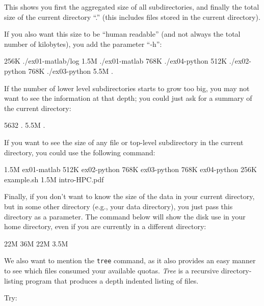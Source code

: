 This shows you first the aggregated size of all subdirectories, and finally the
total size of the current directory ``.'' (this includes files stored in the
current directory).

If you also want this size to be ``human readable'' (and not always the total
number of kilobytes), you add the parameter ``-h'':

\begin{prompt}
256K ./ex01-matlab/log
1.5M ./ex01-matlab
768K ./ex04-python
512K ./ex02-python
768K ./ex03-python
5.5M .
\end{prompt}

If the number of lower level subdirectories starts to grow too big, you may not
want to see the information at that depth; you could just ask for a summary of
the current directory:

\begin{prompt}
5632 .
5.5M .
\end{prompt}

If you want to see the size of any file or top-level subdirectory in the
current directory, you could use the following command:

\begin{prompt}
1.5M ex01-matlab
512K ex02-python
768K ex03-python
768K ex04-python
256K example.sh
1.5M intro-HPC.pdf
\end{prompt}


Finally, if you don't want to know the size of the data in your current
directory, but in some other directory (e.g., your data directory), you just
pass this directory as a parameter. The command below will show the disk use
in your home directory, even if you are currently in a different directory:

\begin{prompt}
22M %
36M %
22M %
3.5M %
\end{prompt}

\ifgent
\else
  We also want to mention the \texttt{tree} command, as it also provides an easy
  manner to see which files consumed your available quotas. \emph{Tree} is a
  recursive directory-listing program that produces a depth indented listing of
  files.

  Try:

\begin{prompt}
\end{prompt}

